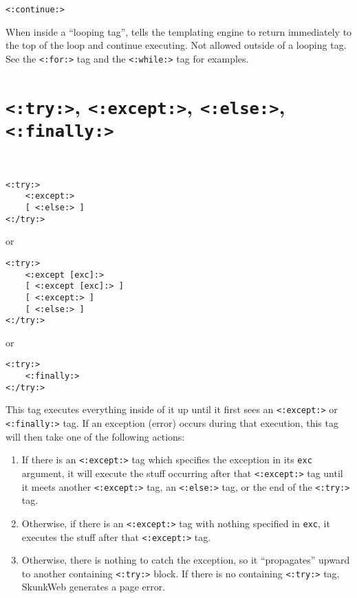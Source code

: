 \documentclass{manual}
\begin{document}
\begin{verbatim}<:continue:>\end{verbatim}

When inside a ``looping tag'', tells the templating engine to return
immediately to the top of the loop and continue executing.
Not allowed outside of a looping tag.
See the \texttt{<:for:>}  tag
and the \texttt{<:while:>}  tag
for examples.


\section{\texttt{<:try:>}, \texttt{<:except:>}, \texttt{<:else:>}, \texttt{<:finally:>}}
\label{tagtry}

\ 

\begin{verbatim}
<:try:>
    <:except:>
    [ <:else:> ]
<:/try:>
\end{verbatim}

or 

\begin{verbatim}
<:try:>
    <:except [exc]:>
    [ <:except [exc]:> ]
    [ <:except:> ]
    [ <:else:> ]
<:/try:>
\end{verbatim}

or 

\begin{verbatim}
<:try:>
    <:finally:>
<:/try:>
\end{verbatim}


This tag executes everything inside of it up until it first sees an
\texttt{<:except:>} or \texttt{<:finally:>} tag. If an exception
(error) occurs during that execution, this tag will then take one of the following
actions:

\begin{enumerate}
\item If there is an \texttt{<:except:>} tag which specifies the
exception in its \texttt{exc} argument, it will execute the stuff occurring
after that \texttt{<:except:>} tag until it meets another 
\texttt{<:except:>} tag, an \texttt{<:else:>} tag, or
the end of the \texttt{<:try:>} tag.

\item Otherwise, if there is an \texttt{<:except:>} tag with
nothing specified in \texttt{exc}, it executes the stuff after that
\texttt{<:except:>} tag.

\item Otherwise, there is nothing to catch the exception, so it ``propagates''
upward to another containing \texttt{<:try:>} block. If there
is no containing \texttt{<:try:>} tag, SkunkWeb generates
a page error.

\end{enumerate}
\end{document}
